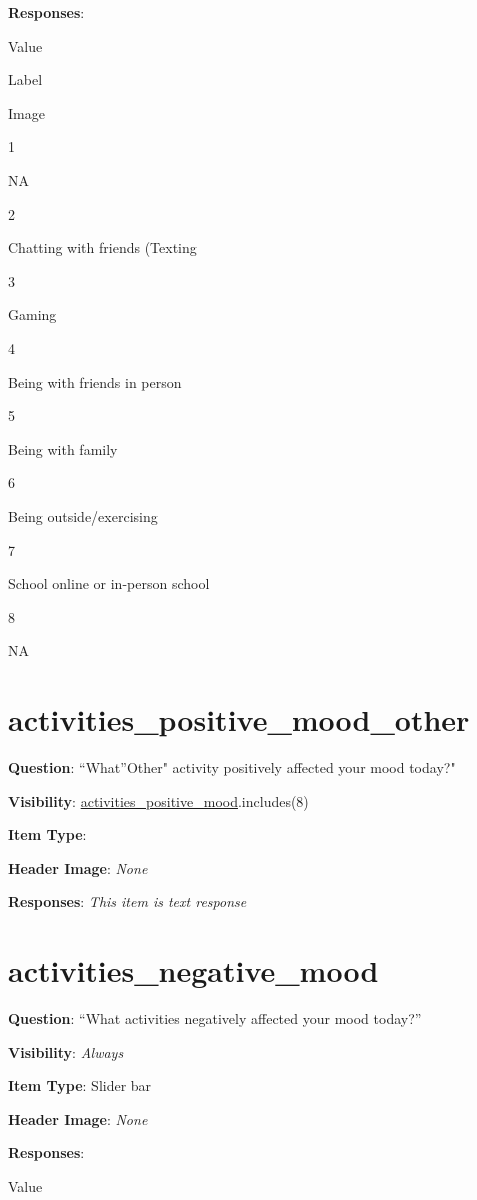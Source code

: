 \documentclass[]{book}
\begin{document}
\textbf{Responses}:

Value

Label

Image

1

NA

2

Chatting with friends (Texting

3

Gaming

4

Being with friends in person

5

Being with family

6

Being outside/exercising

7

School online or in-person school

8

NA

\hypertarget{activities_positive_mood_other}{%
\section{activities\_positive\_mood\_other}\label{activities_positive_mood_other}}

\textbf{Question}: ``What''Other" activity positively affected your mood today?"

\textbf{Visibility}: \protect\hyperlink{activities_positive_mood}{activities\_positive\_mood}.includes(8)

\textbf{Item Type}:

\textbf{Header Image}: \emph{None}

\textbf{Responses}: \emph{This item is text response}

\hypertarget{activities_negative_mood}{%
\section{activities\_negative\_mood}\label{activities_negative_mood}}

\textbf{Question}: ``What activities negatively affected your mood today?''

\textbf{Visibility}: \emph{Always}

\textbf{Item Type}: Slider bar

\textbf{Header Image}: \emph{None}

\textbf{Responses}:

Value
\end{document}
